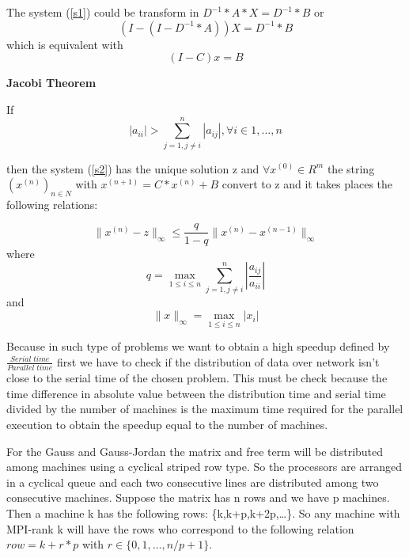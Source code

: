 \documentclass[times,10pt,twocolumn]{article}
\begin{document}
 The system (\ref{s1}) could be transform in $D^{-1}*A*X=D^{-1}*B$ or
$$(I-(I-D^{-1}*A))X=D^{-1}*B$$
 which is equivalent with
    \begin{equation}(I-C)x=B \label{s2}\end{equation}

{\bf Jacobi Theorem}

If
\begin{equation}
|a_{ii}|>\sum_{j=1,j\not=i}^{n}|a_{ij}|,\forall
i\in{1,...,n}\label{jaccond}
\end{equation}

then the system (\ref{s2}) has the unique solution z and $\forall
x^{(0)}\in R^m$ the string $(x^{(n)})_{n\in N}$ with
$x^{(n+1)}=C*x^{(n)}+B$ convert to z and it takes places the
following relations:

$$\|x^{(n)}-z\|_{\infty}\le\frac{q}{1-q}\|x^{(n)}-x^{(n-1)}\|_{\infty}$$
where
\begin{equation}
q=\max_{1\le i\le n}\sum_{j=1,j\ne i}^{n}\left |\frac{a_{ij}}{a_{ii}}\right |\label{q}
\end{equation}
and
\begin{equation}
\|x\|_\infty=\max_{1\le i\le n}|x_i|\label{norma}
\end{equation}


Because in such type of problems we want to obtain a high speedup
defined by $\frac{Serial\; time}{Parallel\; time}$ first we have
to check if the distribution of data over network isn't close to
the serial time of the chosen problem. This must be check because
the time difference in absolute value between the distribution
time and serial time divided by the number of machines is the
maximum time required for the parallel execution to obtain the
speedup equal to the number of machines.

For the Gauss and Gauss-Jordan the matrix and free term will be 
distributed among machines using a cyclical striped row type.
So the processors are arranged in a cyclical queue and each two 
consecutive lines are distributed among two consecutive machines.
Suppose the matrix has n rows and we have p machines. Then a
machine k has the following rows: \{k,k+p,k+2p,\ldots \}. So any
machine with MPI-rank k will have the rows who correspond to the
following relation $row=k+r*p$ with $r\in \{0,1,\ldots ,n/p+1\}$.

\end{document}
